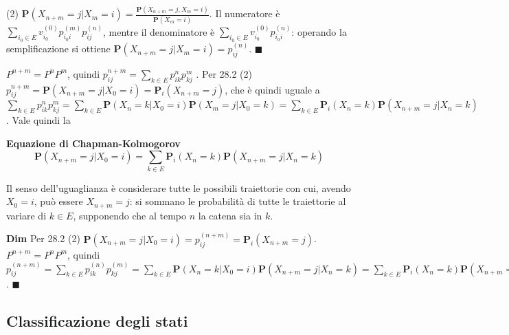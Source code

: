 \documentclass{article}
\begin{document}
(2) $\mathbf{P}\left( X_{n+m}=j|X_{m}=i\right) =\frac{\mathbf{P}\left(
X_{n+m}=j,X_{m}=i\right) }{\mathbf{P}\left( X_{m}=i\right) }$. Il numeratore 
\`{e} $\sum_{i_{0}\in E}v_{i_{0}}^{\left( 0\right) }p_{i_{0}i}^{\left(
m\right) }p_{ij}^{\left( n\right) }$, mentre il denominatore \`{e} $%
\sum_{i_{0}\in E}v_{i_{0}}^{\left( 0\right) }p_{i_{0}i}^{\left( n\right) }$:
operando la semplificazione si ottiene $\mathbf{P}\left(
X_{n+m}=j|X_{m}=i\right) =p_{ij}^{\left( n\right) }$. $\blacksquare $

$P^{n+m}=P^{n}P^{m}$, quindi $p_{ij}^{n+m}=\sum_{k\in E}p_{ik}^{n}p_{kj}^{m}$%
. Per 28.2 (2) $p_{ij}^{n+m}=\mathbf{P}\left( X_{n+m}=j|X_{0}=i\right) =%
\mathbf{P}_{i}\left( X_{n+m}=j\right) $, che \`{e} quindi uguale a $%
\sum_{k\in E}p_{ik}^{n}p_{kj}^{m}=\sum_{k\in E}\mathbf{P}\left(
X_{n}=k|X_{0}=i\right) \mathbf{P}\left( X_{m}=j|X_{0}=k\right) =\sum_{k\in E}%
\mathbf{P}_{i}\left( X_{n}=k\right) \mathbf{P}\left(
X_{n+m}=j|X_{n}=k\right) $. Vale quindi la

\textbf{Equazione di Chapman-Kolmogorov}%
\begin{equation*}
\mathbf{P}\left( X_{n+m}=j|X_{0}=i\right) =\sum_{k\in E}\mathbf{P}_{i}\left(
X_{n}=k\right) \mathbf{P}\left( X_{n+m}=j|X_{n}=k\right)
\end{equation*}

Il senso dell'uguaglianza \`{e} considerare tutte le possibili traiettorie
con cui, avendo $X_{0}=i$, pu\`{o} essere $X_{n+m}=j$: si sommano le
probabilit\`{a} di tutte le traiettorie al variare di $k\in E$, supponendo
che al tempo $n$ la catena sia in $k$.

\textbf{Dim} Per 28.2 (2) $\mathbf{P}\left( X_{n+m}=j|X_{0}=i\right)
=p_{ij}^{\left( n+m\right) }=\mathbf{P}_{i}\left( X_{n+m}=j\right) $. $%
P^{n+m}=P^{n}P^{m}$, quindi $p_{ij}^{\left( n+m\right) }=\sum_{k\in
E}p_{ik}^{\left( n\right) }p_{kj}^{\left( m\right) }=\sum_{k\in E}\mathbf{P}%
\left( X_{n}=k|X_{0}=i\right) \mathbf{P}\left( X_{n+m}=j|X_{n}=k\right)
=\sum_{k\in E}\mathbf{P}_{i}\left( X_{n}=k\right) \mathbf{P}\left(
X_{n+m}=j|X_{n}=k\right) $. $\blacksquare $

\subsection{Classificazione degli stati}
\end{document}
